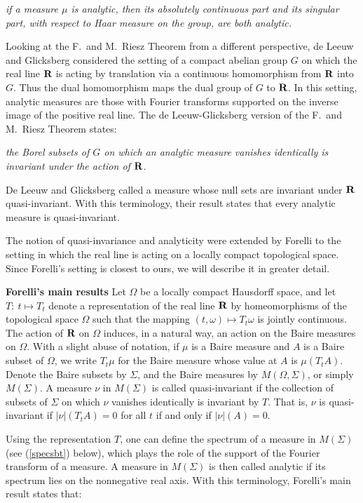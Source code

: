 {\em if a measure $\mu$ is analytic, then its absolutely continuous 
part and its singular part, with respect to 
Haar measure on the group, are both analytic.}

Looking at the F.\ and M.\ Riesz Theorem from a different 
perspective, de Leeuw and Glicksberg 
considered the setting of a compact abelian
group $G$ on which the real line $\R$ is acting by translation via 
a continuous homomorphism from $\R$ into $G$.
Thus the dual homomorphism maps the dual group of $G$ to $\R$.
In this setting, analytic measures are those with
Fourier transforms supported on the inverse image of
the positive real line.
The de Leeuw-Glicksberg version of the F.\ and M.\ Riesz Theorem states:

{\em the Borel subsets of $G$ on which an analytic measure 
vanishes identically is invariant under the action of $\R$.}

De Leeuw and Glicksberg called a measure
whose null sets are invariant under $\R$ quasi-invariant.  With
this terminology, their result states
that every analytic measure is quasi-invariant.

The notion of quasi-invariance and analyticity were extended by Forelli
\cite{forelli} to the setting in which the real line is acting
on a locally compact topological space.
Since Forelli's setting is closest to ours, we 
will describe it in greater detail.

\bigskip
\noindent
{\bf Forelli's main results}  Let $\Omega$ be a locally compact 
Hausdorff space, and let $T:\ t\mapsto T_t$ 
denote a representation
of the real line $\R$ by homeomorphisms of the 
topological space $\Omega$ such that 
the mapping $(t,\omega)\mapsto T_t\omega$ 
is jointly continuous.
The action of $\R$ on $\Omega$ induces,
in a natural way, an action on the Baire measures on
$\Omega$.  With a slight abuse of notation,
if $\mu$ is a Baire measure and $A$ is a Baire
subset of $\Omega$, we write
$T_t\mu$ for the Baire measure whose value at $A$ is
$\mu(T_t A)$.  Denote the Baire subsets by 
$\Sigma$, and the Baire measures 
by $M(\Omega,\Sigma)$, or simply $M(\Sigma)$.
A measure $\nu$ in $M(\Sigma)$ is called quasi-invariant if
the collection of subsets of $\Sigma$ on which 
$\nu$ vanishes identically is invariant by $T$.
That is, $\nu$ is quasi-invariant if
$|\nu|(T_t A)=0 $ for all $t$ if and only if
$|\nu|(A)=0 $.

Using the representation $T$, one can 
define the spectrum of a measure in $M(\Sigma)$ 
(see (\ref{specsbt}) below), which plays 
the role of the support of the Fourier transform of a measure. 
A measure in $M(\Sigma)$ is then called 
analytic if its spectrum lies on the nonnegative real axis.
With this terminology, Forelli's 
main result states that:

